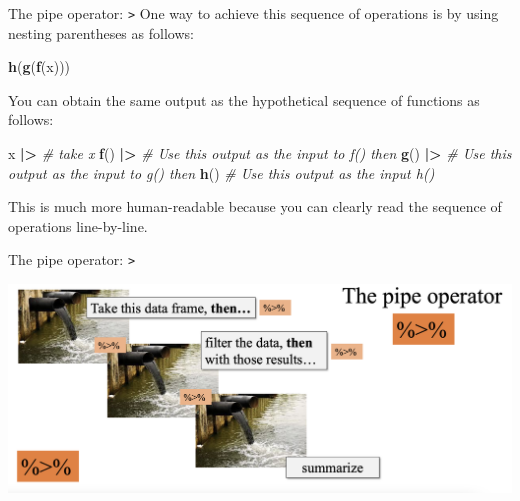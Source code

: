 \documentclass[
  ignorenonframetext,
]{beamer}
\newenvironment{Shaded}{\begin{snugshade}}{\end{snugshade}}
\newcommand{\CommentTok}[1]{\textcolor[rgb]{0.56,0.35,0.01}{\textit{#1}}}
\newcommand{\FunctionTok}[1]{\textcolor[rgb]{0.13,0.29,0.53}{\textbf{#1}}}
\newcommand{\NormalTok}[1]{#1}
\newcommand{\SpecialCharTok}[1]{\textcolor[rgb]{0.81,0.36,0.00}{\textbf{#1}}}
\begin{document}
\begin{frame}[fragile]{The pipe operator:
\texttt{\textbar{}\textgreater{}}}
\protect\hypertarget{the-pipe-operator-1}{}
One way to achieve this sequence of operations is by using nesting
parentheses as follows:

\normalsize

\begin{Shaded}
\begin{Highlighting}[]
\FunctionTok{h}\NormalTok{(}\FunctionTok{g}\NormalTok{(}\FunctionTok{f}\NormalTok{(x)))}
\end{Highlighting}
\end{Shaded}

\normalsize

You can obtain the same output as the hypothetical sequence of functions
as follows:

\normalsize

\begin{Shaded}
\begin{Highlighting}[]
\NormalTok{x }\SpecialCharTok{|\textgreater{}}       \CommentTok{\# take x}
  \FunctionTok{f}\NormalTok{() }\SpecialCharTok{|\textgreater{}}   \CommentTok{\# Use this output as the input to f() then}
  \FunctionTok{g}\NormalTok{() }\SpecialCharTok{|\textgreater{}}   \CommentTok{\# Use this output as the input to g() then}
  \FunctionTok{h}\NormalTok{()       }\CommentTok{\# Use this output as the input h()}
\end{Highlighting}
\end{Shaded}

\normalsize

This is much more human-readable because you can clearly read the
sequence of operations line-by-line.
\end{frame}

\begin{frame}{The pipe operator: \texttt{\textbar{}\textgreater{}}}
\protect\hypertarget{the-pipe-operator-2}{}
\begin{center}\includegraphics[width=0.8\linewidth,height=0.6\textheight]{week3_9} \end{center}
\end{frame}
\end{document}
